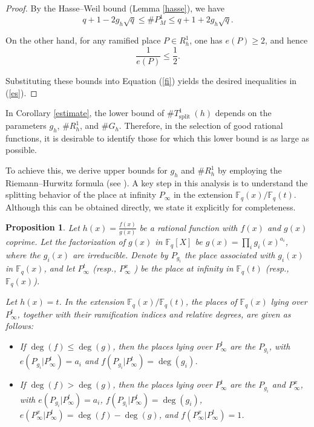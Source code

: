 \documentclass[1p,final]{elsarticle}
\newtheorem{proposition}[theorem]{Proposition}
\newtheorem{open problem}[theorem]{Open Problem}
\begin{document}
\begin{proof}
By the Hasse--Weil bound (Lemma \ref{hasse}), we have
\[
q+1-2g_h\sqrt{q} \le \#P_{M}^{1} \le q+1+2g_h\sqrt{q}.
\]

On the other hand, for any ramified place $P\in R_{h}^{1}$, one has $e(P)\ge 2$, and hence
\[
\frac{1}{e(P)} \le \frac{1}{2}.
\]

Substituting these bounds into Equation (\ref{fi}) yields the desired inequalities in (\ref{es}).
\end{proof}

In Corollary \ref{estimate}, the lower bound of $\# T_{\text {split }}^1(h)$ depends on the parameters $g_{h}$, $\# R^1_h$, and $\# G_{h}$. Therefore, in the selection of good rational functions, it is desirable to identify those for which this lower bound is as large as possible.

\medskip

To achieve this, we derive upper bounds for $g_{h}$ and $\# R^1_h$ by employing the Riemann--Hurwitz formula (see \cite{Stichtenoth2009}). A key step in this analysis is to understand the splitting behavior of the place at infinity $P_{\infty}$ in the extension $\mathbb{F}_{q}(x)/ \mathbb{F}_{q}(t)$. Although this can be obtained directly, we state it explicitly for completeness.

\begin{proposition}\label{infi}
Let $h(x)=\displaystyle\frac{f(x)}{g(x)}$ be a rational function with $f(x)$ and $g(x)$ coprime. Let the factorization of $g(x)$ in $\mathbb{F}_{q}\left [ X \right ] $ be $g(x)=\displaystyle\prod_{ i }g_{{i}}(x)^{a_{i}}$, where the $g_{i}(x)$ are irreducible. Denote by $P_{g_{i}}$ the place associated with $g_{i}(x)$ in $\mathbb{F}_{q}(x)$, and let $P_{\infty}^{t}$ (resp., $P_{\infty}^{x}$ ) be the place at infinity in $\mathbb{F}_{q}(t)$ (resp., $\mathbb{F}_{q}(x)$). 

Let $h(x)=t$. In the extension $\mathbb{F}_{q}(x)/\mathbb{F}_{q}(t)$, the places of $\mathbb{F}_{q}(x)$ lying over $P_{\infty}^{t}$, together with their ramification indices and relative degrees, are given as follows:

\begin{itemize}
\item[(i)] If $\deg(f)\le \deg(g)$, then the places lying over $P_{\infty}^{t}$ are the $P_{g_{i}}$, with $e(P_{g_{i}}|P_{\infty}^{t})=a_{i}$ and $f(P_{g_{i}}|P_{\infty}^{t})=\deg(g_{i})$.
\item[(ii)] If $\deg(f)>\deg(g)$, then the places lying over $P_{\infty}^{t}$ are the $P_{g_{i}}$ and $P_{\infty}^{x}$, with $e(P_{g_{i}}|P_{\infty}^{t})=a_{i}$, $f(P_{g_{i}}|P_{\infty}^{t})=\deg(g_{i})$, $e(P_{\infty}^{x}|P_{\infty}^{t})=\deg(f)-\deg(g)$, and $f(P_{\infty}^{x}|P_{\infty}^{t})=1$. 
\end{itemize} 
\end{proposition}
\end{document}
